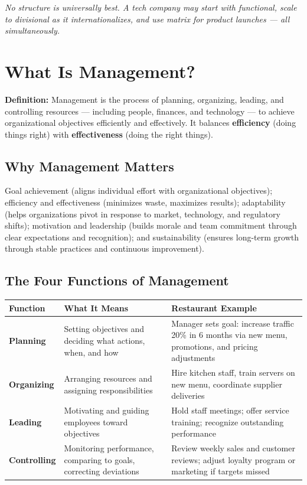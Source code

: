 \documentclass[11pt, letterpaper]{article}
\begin{document}
\textit{No structure is universally best. A tech company may start with functional, scale to divisional as it internationalizes, and use matrix for product launches --- all simultaneously.}

\newpage

\section{What Is Management?}

\begin{defbox}
\textbf{Definition:} Management is the process of planning, organizing, leading, and controlling resources --- including people, finances, and technology --- to achieve organizational objectives efficiently and effectively. It balances \textbf{efficiency} (doing things right) with \textbf{effectiveness} (doing the right things).
\end{defbox}

\subsection{Why Management Matters}

Goal achievement (aligns individual effort with organizational objectives); efficiency and effectiveness (minimizes waste, maximizes results); adaptability (helps organizations pivot in response to market, technology, and regulatory shifts); motivation and leadership (builds morale and team commitment through clear expectations and recognition); and sustainability (ensures long-term growth through stable practices and continuous improvement).

\subsection{The Four Functions of Management}

\begin{center}
\begin{tabular}{>{\bfseries}p{2.5cm} p{5cm} p{5cm}}
\toprule
Function & What It Means & Restaurant Example \\
\midrule
Planning & Setting objectives and deciding what actions, when, and how & Manager sets goal: increase traffic 20\% in 6 months via new menu, promotions, and pricing adjustments \\
\addlinespace
Organizing & Arranging resources and assigning responsibilities & Hire kitchen staff, train servers on new menu, coordinate supplier deliveries \\
\addlinespace
Leading & Motivating and guiding employees toward objectives & Hold staff meetings; offer service training; recognize outstanding performance \\
\addlinespace
Controlling & Monitoring performance, comparing to goals, correcting deviations & Review weekly sales and customer reviews; adjust loyalty program or marketing if targets missed \\
\bottomrule
\end{tabular}
\end{center}
\end{document}
